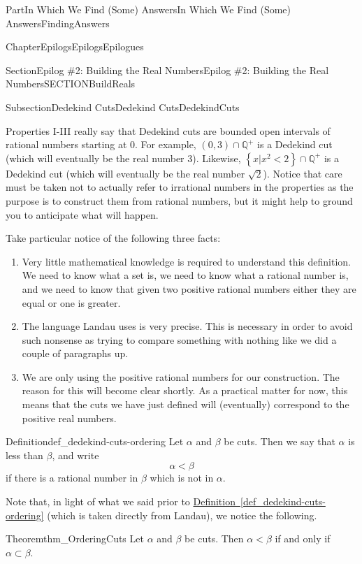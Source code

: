 \documentclass[oneside,10pt,]{book}
\newcommand{\xreffont}{\relax}
\numberwithin{equation}{part}
\newcommand{\QQ}{\mathbb {Q}}
\newcommand{\lt}{<}
\begin{document}
\begin{partptx}{Part}{In Which We Find (Some) Answers}{}{In Which We Find (Some) Answers}{}{}{FindingAnswers}
\begin{chapterptx}{Chapter}{Epilogs}{}{Epilogs}{}{}{Epilogues}
\begin{sectionptx}{Section}{Epilog \#2: Building the Real Numbers}{}{Epilog \#2: Building the Real Numbers}{}{}{SECTIONBuildReals}
\begin{subsectionptx}{Subsection}{Dedekind Cuts}{}{Dedekind Cuts}{}{}{DedekindCuts}
%
\par
Properties I-III really say that Dedekind cuts are bounded open intervals of rational numbers starting at \(0\). For example, \((0,3)\cap\QQ^+\) is a Dedekind cut (which will eventually be the real number \(3\)).  Likewise, \(\left\{x|x^2\lt 2\right\}\cap\QQ^+\) is a Dedekind cut (which will eventually be the real number \(\sqrt{2}\)). Notice that care must be taken not to actually refer to irrational numbers in the properties as the purpose is to construct them from rational numbers, but it might help to ground you to anticipate what will happen.%
\par
Take particular notice of the following three facts:%
\begin{enumerate}
\item{}Very little mathematical knowledge is required to understand this definition.  We need to know what a set is, we need to know what a rational number is, and we need to know that given two positive rational numbers either they are equal or one is greater.%
\item{}The language Landau uses is very precise. This is necessary in order to avoid such nonsense as trying to compare something with nothing like we did a couple of paragraphs up.%
\item{}We are only using the positive rational numbers for our construction.  The reason for this will become clear shortly.  As a practical matter for now, this means that the cuts we have just defined will (eventually) correspond to the positive real numbers.%
\end{enumerate}
%
\begin{definition}{Definition}{}{def_dedekind-cuts-ordering}%
%
%
%
Let \(\alpha\) and \(\beta\) be cuts.  Then we say that \(\alpha\) is less than \(\beta\), and write%
\begin{equation*}
\alpha\lt \beta
\end{equation*}
if there is a rational number in \(\beta\) which is not in \(\alpha\).%
\end{definition}
Note that, in light of what we said prior to \hyperref[def_dedekind-cuts-ordering]{Definition~{\xreffont\ref{def_dedekind-cuts-ordering}}} (which is taken directly from Landau), we notice the following.%
\begin{theorem}{Theorem}{}{}{thm_OrderingCuts}%
%
Let \(\alpha\) and \(\beta\) be cuts.  Then \(\alpha\lt \beta\) if and only if \(\alpha\subset\beta\).%

\end{theorem}
\end{subsectionptx}
\end{sectionptx}
\end{chapterptx}
\end{partptx}
\end{document}
